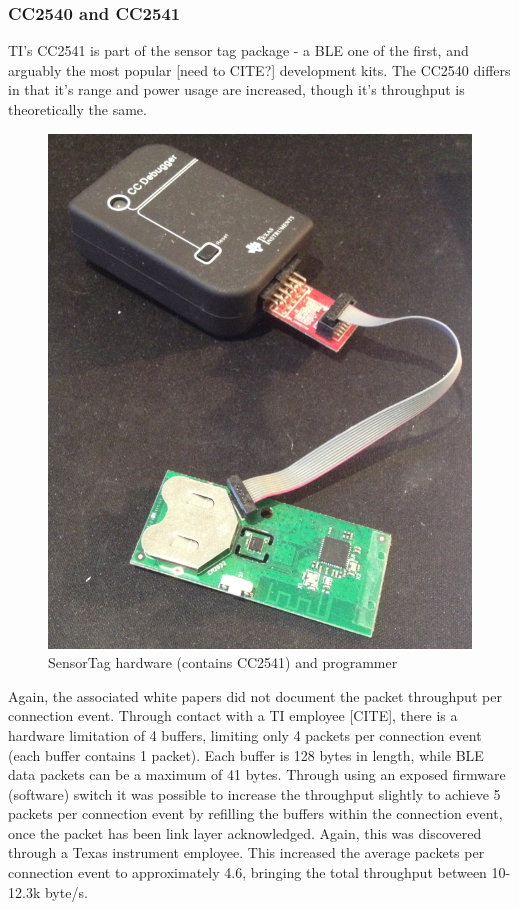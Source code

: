 \documentclass[]{article}
\begin{document}
\clearpage
\subsubsection{CC2540 and CC2541}
\ac{TI}'s CC2541 is part of the sensor tag package - a \ac{BLE} one of the first, and arguably the most popular [need to CITE?] development kits. The CC2540 differs in that it's range and power usage are increased, though it's throughput is theoretically the same.

\begin{figure}[H]
	\begin{center}
		\includegraphics[width = \textwidth]{sensortag.png}
	\end{center}
	\caption{SensorTag hardware (contains CC2541) and programmer}
	\label{fig:sensortag}
\end{figure}

Again, the associated white papers did not document the packet throughput per connection event. Through contact with a \ac{TI} employee [CITE], there is a hardware limitation of 4 buffers, limiting only 4 packets per connection event (each buffer contains 1 packet). Each buffer is 128 bytes in length, while \ac{BLE} data packets can be a maximum of 41 bytes. Through using an exposed firmware (software) switch it was possible to increase the throughput slightly to achieve 5 packets per connection event by refilling the buffers within the connection event, once the packet has been link layer acknowledged. Again, this was discovered through a Texas instrument employee. This increased the average packets per connection event to approximately 4.6, bringing the total throughput between 10-12.3k byte/s.
\end{document}
